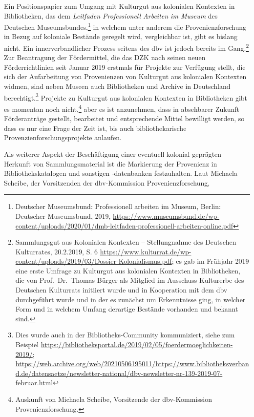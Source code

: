 \documentclass[a4paper,
fontsize=11pt,
oneside,
numbers=noperiodatend,
parskip=half-,
bibliography=totoc,
final
]{scrartcl}
\begin{document}
Ein Positionspapier zum Umgang mit Kulturgut aus kolonialen Kontexten in
Bibliotheken, das dem \emph{Leitfaden Professionell Arbeiten im Museum}
des Deutschen Museumsbundes,\footnote{Deutscher Museumsbund:
  Professionell arbeiten im Museum, Berlin: Deutscher Museumsbund, 2019,
  \url{https://www.museumsbund.de/wp-content/uploads/2020/01/dmb-leitfaden-professionell-arbeiten-online.pdf}}
in welchem unter anderem die Provenienzforschung in Bezug auf koloniale
Bestände geregelt wird, vergleichbar ist, gibt es bislang nicht. Ein
innerverbandlicher Prozess seitens des dbv ist jedoch bereits im
Gang.\footnote{Sammlungsgut aus Kolonialen Kontexten -- Stellungnahme
  des Deutschen Kulturrates, 20.2.2019, S. 6
  \url{https://www.kulturrat.de/wp-content/uploads/2019/03/Dossier-Kolonialismus.pdf};
  es gab im Frühjahr 2019 eine erste Umfrage zu Kulturgut aus kolonialen
  Kontexten in Bibliotheken, die von Prof.~Dr.~Thomas Bürger als
  Mitglied im Ausschuss Kulturerbe des Deutschen Kulturrats initiiert
  wurde und in Kooperation mit dem dbv durchgeführt wurde und in der es
  zunächst um Erkenntnisse ging, in welcher Form und in welchem Umfang
  derartige Bestände vorhanden und bekannt sind.} Zur Beantragung der
Fördermittel, die das DZK nach seinen neuen Förderrichtlinien seit
Januar 2019 erstmals für Projekte zur Verfügung stellt, die sich der
Aufarbeitung von Provenienzen von Kulturgut aus kolonialen Kontexten
widmen, sind neben Museen auch Bibliotheken und Archive in Deutschland
berechtigt.\footnote{Dies wurde auch in der Bibliotheks-Community
  kommuniziert, siehe zum Beispiel
  \url{https://bibliotheksportal.de/2019/02/05/foerdermoeglichkeiten-2019/};
  \url{https://web.archive.org/web/20210506195011/https://www.bibliotheksverband.de/datensaetze/newsletter-national/dbv-newsletter-nr-139-2019-07-februar.html}}
Projekte zu Kulturgut aus kolonialen Kontexten in Bibliotheken gibt es
momentan noch nicht,\footnote{Auskunft von Michaela Scheibe, Vorsitzende
  der dbv-Kommission Provenienzforschung.} aber es ist anzunehmen, dass
in absehbarer Zukunft Förderanträge gestellt, bearbeitet und
entsprechende Mittel bewilligt werden, so dass es nur eine Frage der
Zeit ist, bis auch bibliothekarische Provenzienforschungsprojekte
anlaufen.

Als weiterer Aspekt der Beschäftigung einer eventuell kolonial geprägten
Herkunft von Sammlungsmaterial ist die Markierung der Provenienz in
Bibliothekskatalogen und sonstigen -daten\-banken festzuhalten. Laut
Michaela Scheibe, der Vorsitzenden der dbv-Kommission
Provenienzforschung,
\end{document}
